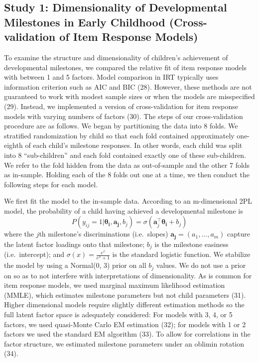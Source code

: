 \documentclass[man]{apa7}
\begin{document}
\subsection*{Study 1: Dimensionality of Developmental Milestones in Early Childhood (Cross-validation of Item Response Models)}

To examine the structure and dimensionality of children's achievement of
developmental milestones, we compared the relative fit of item response
models with between 1 and 5 factors. Model comparison in IRT typically
uses information criterion such as AIC and BIC (28). However, these
methods are not guaranteed to work with modest sample sizes or when the
models are misspeciﬁed (29). Instead, we implemented a version of
cross-validation for item response models with varying numbers of
factors (30). The steps of our cross-validation procedure are as
follows. We began by partitioning the data into 8 folds. We stratified
randomization by child so that each fold contained approximately
one-eighth of each child's milestone responses. In other words, each
child was split into 8 ``sub-children'' and each fold contained exactly
one of these sub-children. We refer to the fold hidden from the data as
out-of-sample and the other 7 folds as in-sample. Holding each of the 8
folds out one at a time, we then conduct the following steps for each
model.

We first fit the model to the in-sample data. According to an
m-dimensional 2PL model, the probability of a child having achieved a
developmental milestone is \begin{equation}
P(y_{ij} = 1 | \boldsymbol{\theta_i}, \boldsymbol{a_j}, b_j) = \sigma(\boldsymbol{a}_{j}^{\top}\boldsymbol{\theta_i} + b_j)
\end{equation} where the \(j\)th milestone's discriminations
(i.e.~slopes) \(\boldsymbol{a_j} = (a_1 ,..., a_m)\) capture the latent
factor loadings onto that milestone; \(b_j\) is the milestone easiness
(i.e.~intercept); and \(\sigma(x) = \frac{e^x}{e^x + 1}\) is the
standard logistic function. We stabilize the model by using a Normal(0,
3) prior on all \(b_j\) values. We do not use a prior on so as to not
interfere with interpretations of dimensionality. As is common for item
response models, we used marginal maximum likelihood estimation (MMLE),
which estimates milestone parameters but not child parameters (31).
Higher dimensional models require slightly different estimation methods
so the full latent factor space is adequately considered: For models
with 3, 4, or 5 factors, we used quasi-Monte Carlo EM estimation (32);
for models with 1 or 2 factors we used the standard EM algorithm (33).
To allow for correlations in the factor structure, we estimated
milestone parameters under an oblimin rotation (34).
\end{document}

